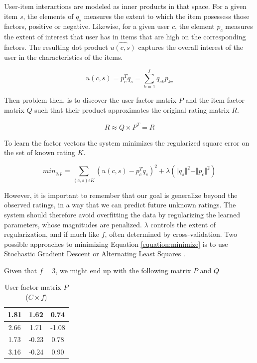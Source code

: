 User-item interactions are modeled as inner products in that space. For a given item $s$, the elements of $q_{s}$ measures the extent to which the item posessess those factors, positive or negative. Likewise, for a given user $c$, the element $p_{c}$ measures the extent of interest that user has in items that are high on the corresponding factors. The resulting dot product $\hat{u(c,s)}$ captures the overall interest of the user in the characteristics of the items.

\begin{equation}
u(c,s) = p_{c}^{T}q_{s} = \sum_{k=1}^{f} q_{sk}p_{kc}
\end{equation}

Then problem then, is to discover the user factor matrix $P$ and the item factor matrix $Q$ such that their product approximates the original rating matrix $R$.

\begin{equation}
R \approx Q \times P^{T} = \hat{R}
\end{equation}

To learn the factor vectors the system minimizes the regularized square error on the set of known rating $K$.

\begin{equation}
\label{equation:minimize}
min_{q, p} = \sum_{(c,s)\epsilon K} (u(c,s) - p^{T}_{c}q_{s})^{2} + \lambda ( \Vert q_{s} \Vert ^{2} + \Vert p_{c} \Vert ^{2})
\end{equation}

However, it is important to remember that our goal is generalize beyond the observed ratings, in a way that we can predict future unknown ratings. The system should therefore avoid overfitting the data by regularizing the learned parameters, whose magnitudes are penalized. $\lambda$ controls the extent of regularization, and if much like $f$, often determined by cross-validation. Two possible approaches to minimizing Equation \ref{equation:minimize} is to use Stochastic Gradient Descent or Alternating Least Squares \citep{Koren2009}.

Given that $f = 3$, we might end up with the following matrix $P$ and $Q$

\begin{table}[!htbp]
\centering
\begin{tabular}{|c|c|c|}
\hline
1.81	&1.62	&0.74\\ \hline
2.66	&1.71	&-1.08\\ \hline
1.73	&-0.23	&0.78\\ \hline
3.16	&-0.24	&0.90\\ \hline
\end{tabular}
\label{table:ItemFeature}
\caption{User factor matrix $P$ ($C \times f$)}
\end{table}

